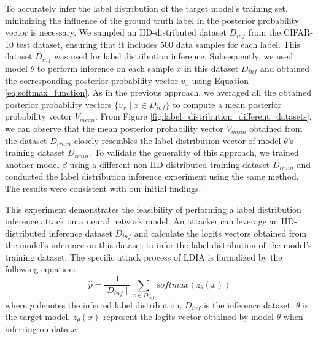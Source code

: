 \iffalse
To accurately infer the label distribution of the target model's training set, minimizing the influence of the ground truth label in the posterior probability vector is necessary. 
We sampled an IID-distributed dataset $D_{inf}$ from the CIFAR-10 test dataset, ensuring that it includes 500 data samples for each label.
This dataset $D_{inf}$ was used for label distribution inference. 
Subsequently, we used model $\theta$ to perform inference on each sample $x$ in this dataset $D_{inf}$ and obtained the corresponding posterior probability vector $v_x$ using Equation \ref{eq:softmax_function}.
As in the previous approach, we averaged all the obtained posterior probability vectors $\{v_x \mid x\in D_{inf}\}$ to compute a mean posterior probability vector $V_{mean}$.
From Figure \ref{fig:label_distribution_different_datasets}, we can observe that the mean posterior probability vector $V_{mean}$ obtained from the dataset $D_{train}$ closely resembles the label distribution vector of model $\theta$'s training dataset $D_{train}$. To validate the generality of this approach, we trained another model $\beta$ using a different non-IID distributed training dataset $D_{train}$ and conducted the label distribution inference experiment using the same method. 
The results were consistent with our initial findings.

This experiment demonstrates the feasibility of performing a label distribution inference attack on a neural network model.
An attacker can leverage an IID-distributed inference dataset $D_{inf}$ and calculate the logits vectors obtained from the model's inference on this dataset to infer the label distribution of the model's training dataset.
The specific attack process of LDIA is formalized by the following equation:
\begin{equation}
    \hat{p} = \frac{1}{\mid D_{inf} \mid} \sum_{x \in D_{inf}} softmax(z_{\theta}(x))
\label{eq:ldia}
\end{equation}
where $\hat{p}$ denotes the inferred label distribution, $D_{inf}$ is the inference dataset, $\theta$ is the target model, $z_{\theta}(x)$ represent the logits vector obtained by model $\theta$ when inferring on data $x$.

